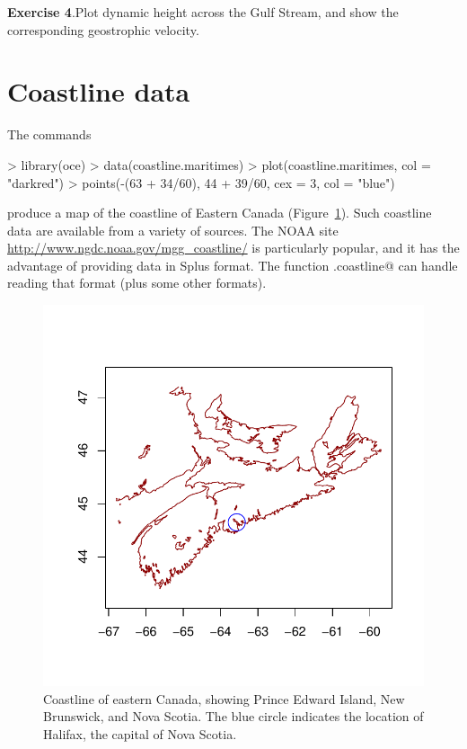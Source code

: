 \documentclass{article}
\newcommand{\workedexercise}[2]{
	\vspace{2ex plus 2ex minus 1ex}
	\begin{boxedminipage}[c]{0.95\linewidth}
		{\textbf{Exercise #1}.\hspace{1em}#2}
	\end{boxedminipage}
	\vspace{2ex plus 2ex minus 1ex}
}
\begin{document}
\workedexercise{4}{Plot dynamic height across the Gulf Stream, and show the corresponding geostrophic velocity.}

\section{Coastline data}


The commands
\begin{Schunk}
\begin{Sinput}
> library(oce)
> data(coastline.maritimes)
> plot(coastline.maritimes, col = "darkred")
> points(-(63 + 34/60), 44 + 39/60, cex = 3, col = "blue")
\end{Sinput}
\end{Schunk}
produce a map of the coastline of Eastern Canada
(Figure~\ref{fig:coastline}). Such coastline data are available from a variety
of sources. The NOAA site \url{http://www.ngdc.noaa.gov/mgg_coastline/} is
particularly popular, and it has the advantage of providing data in Splus
format.  The function \verb@read.coastline@ can handle reading that format (plus
some other formats).
\begin{figure}
\begin{center}
\includegraphics{oce-coastlinefig}
\end{center}
\caption{Coastline of eastern Canada, showing Prince Edward Island, New
Brunswick, and Nova Scotia.  The blue circle indicates the location of Halifax,
the capital of Nova Scotia.}
\label{fig:coastline}
\end{figure}
\end{document}
